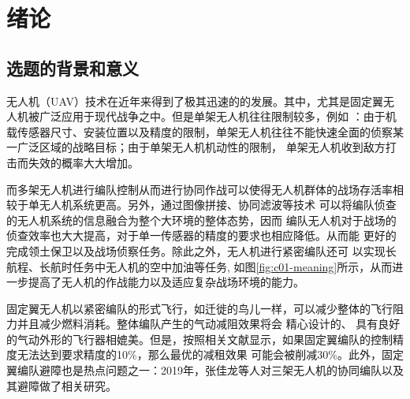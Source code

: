 %
%
%
%

\chapter{绪论}
\label{chap:intro}
\section{选题的背景和意义}
无人机（UAV）技术在近年来得到了极其迅速的的发展。其中，尤其是固定翼无人机被广泛应用于现代战争之中。但是单架无人机往往限制较多，例如
：由于机载传感器尺寸、安装位置以及精度的限制，单架无人机往往不能快速全面的侦察某一广泛区域的战略目标；由于单架无人机机动性的限制，
单架无人机收到敌方打击而失效的概率大大增加。

而多架无人机进行编队控制从而进行协同作战可以使得无人机群体的战场存活率相较于单无人机系统更高。另外，通过图像拼接、协同滤波等技术
可以将编队侦查的无人机系统的信息融合为整个大环境的整体态势，因而
编队无人机对于战场的侦查效率也大大提高，对于单一传感器的精度的要求也相应降低。从而能
更好的完成领土保卫以及战场侦察任务。除此之外，无人机进行紧密编队还可
以实现长航程、长航时任务中无人机的空中加油等任务, 如图\ref{fig:c01-meaning}所示，从而进一步提高了无人机的作战能力以及适应复杂战场环境的能力。

固定翼无人机以紧密编队的形式飞行，如迁徙的鸟儿一样，可以减少整体的飞行阻力并且减少燃料消耗。整体编队产生的气动减阻效果将会
精心设计的、
具有良好的气动外形的飞行器相媲美。但是，按照相关文献显示，如果固定翼编队的控制精度无法达到要求精度的10\%，那么最优的减租效果
可能会被削减30\%。\cite{Zhang2017Aerodynamics}此外，固定翼编队避障也是热点问题之一：2019年，张佳龙等人对三架无人机的协同编队以及
其避障做了相关研究。\cite{Zzhangjialong2019Collision}

